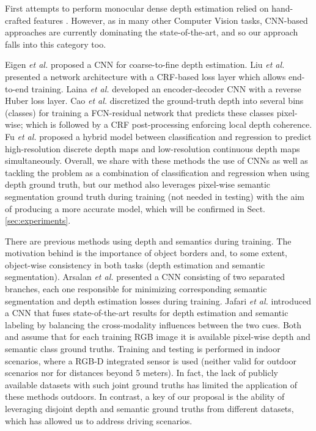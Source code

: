 \documentclass[letterpaper, 10 pt, conference]{ieeeconf}
\newcommand{\etal}{{\em et al.}}
\newcommand{\Sect}[1]{Sect. \ref{sec:#1}}
\begin{document}
First attempts to perform monocular dense depth estimation relied on hand-crafted features \cite{Liu:2010, Ladicky:2014}. However, as in many other Computer Vision tasks, CNN-based approaches are currently dominating the state-of-the-art, and so our approach falls into this category too. 

Eigen {\etal} \cite{Eigen:2014} proposed a CNN for coarse-to-fine depth estimation. Liu {\etal} \cite{Liu:2016} presented a network architecture with a CRF-based loss layer which allows end-to-end training. Laina {\etal} \cite{Laina:2016} developed an encoder-decoder CNN with a reverse Huber loss layer. Cao {\etal} \cite{Cao:2017} discretized the ground-truth depth into several bins (classes) for training a FCN-residual network that predicts these classes pixel-wise; which is followed by a CRF post-processing enforcing local depth coherence. Fu  {\etal} \cite{Fu:2017} proposed a hybrid model between classification and regression to predict high-resolution discrete depth maps and low-resolution continuous depth maps simultaneously. Overall, we share with these methods the use of CNNs as well as tackling the problem as a combination of classification and regression when using depth ground truth, but our method also leverages pixel-wise semantic segmentation ground truth during training (not needed in testing) with the aim of producing a more accurate model, which will be confirmed in \Sect{experiments}.


There are previous methods using depth and semantics during training. The motivation behind is the importance of object borders and, to some extent, object-wise consistency in both tasks (depth estimation and semantic segmentation). Arsalan {\etal} \cite{Mousavian:2016} presented a CNN consisting of two separated branches, each one responsible for minimizing corresponding semantic segmentation and depth estimation losses during training. Jafari {\etal} \cite{Jafari:2017} introduced a CNN that fuses state-of-the-art results for depth estimation and semantic labeling by balancing the cross-modality influences between the two cues. Both \cite{Mousavian:2016} and \cite{Jafari:2017} assume that for each training RGB image it is available pixel-wise depth and semantic class ground truths. Training and testing is performed in indoor scenarios, where a RGB-D integrated sensor is used (neither valid for outdoor scenarios nor for distances beyond 5 meters). In fact, the lack of publicly available datasets with such joint ground truths has limited the application of these methods outdoors. In contrast, a key of our proposal is the ability of leveraging disjoint depth and semantic ground truths from different datasets, which has allowed us to address driving scenarios. 
\end{document}
